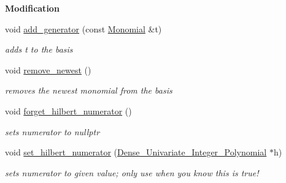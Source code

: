 \begin{Indent}\textbf{ Modification}\par
\begin{DoxyCompactItemize}
\item 
\mbox{\label{group__polygroup_a10135daadd19fbd37cde2c1109eaf26d}} 
void \hyperlink{group__polygroup_a10135daadd19fbd37cde2c1109eaf26d}{add\+\_\+generator} (const \hyperlink{group__polygroup_class_monomial}{Monomial} \&t)
\begin{DoxyCompactList}\small\item\em adds {\ttfamily t} to the basis \end{DoxyCompactList}\item 
\mbox{\label{group__polygroup_a5410d31236ca04dfca3fe27acb7553f4}} 
void \hyperlink{group__polygroup_a5410d31236ca04dfca3fe27acb7553f4}{remove\+\_\+newest} ()
\begin{DoxyCompactList}\small\item\em removes the newest monomial from the basis \end{DoxyCompactList}\item 
\mbox{\label{group__polygroup_a5653fee1985ec45e11c594d7de53385b}} 
void \hyperlink{group__polygroup_a5653fee1985ec45e11c594d7de53385b}{forget\+\_\+hilbert\+\_\+numerator} ()
\begin{DoxyCompactList}\small\item\em sets numerator to {\ttfamily nullptr} \end{DoxyCompactList}\item 
\mbox{\label{group__polygroup_ab0c510ed85328199cce722831143165e}} 
void \hyperlink{group__polygroup_ab0c510ed85328199cce722831143165e}{set\+\_\+hilbert\+\_\+numerator} (\hyperlink{group__polygroup_class_dense___univariate___integer___polynomial}{Dense\+\_\+\+Univariate\+\_\+\+Integer\+\_\+\+Polynomial} $\ast$h)
\begin{DoxyCompactList}\small\item\em sets numerator to given value; only use when you know this is true! \end{DoxyCompactList}\end{DoxyCompactItemize}
\end{Indent}
